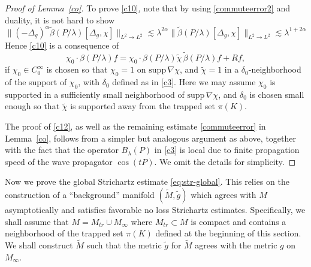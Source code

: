 \documentclass[10pt]{amsart}
\newcommand{\la}{\lambda}
\newcommand{\supp}{\mathrm{supp }}
\newcommand{\1}{{\bf 1}}
\begin{document}
\begin{proof}[Proof of Lemma~\ref{co}]
To prove \eqref{c10}, note that by using \eqref{commuteerror2} and duality, it is not hard to show 
$$\|(-\Delta_g)^\alpha\tilde\beta(P/\la)  [\Delta_g,\chi]\|_{L^2\to L^2}\lesssim \la^{2\alpha}\|\tilde\beta(P/\la)  [\Delta_g,\chi]\|_{L^2\to L^2} \lesssim \la^{1+2\alpha}$$
Hence \eqref{c10} is a consequence of 
\begin{equation}\label{c12}
\chi_0 \cdot \beta(P/\la)f
   =\chi_0 \cdot \beta(P/\la)\tilde\chi \,\tilde\beta(P/\la) f
+Rf,
\end{equation}
if $\chi_0\in C_0^\infty$ is chosen so that $\chi_0=1$ on $\supp\, \nabla\chi$, and $\tilde \chi=1$ in a $\delta_0$-neighborhood of the support of $\chi_0$, with $\delta_0$ defined as in \eqref{c3}. Here we may assume $\chi_0$ is supported in a sufficiently small neighborhood of $\supp\, \nabla\chi$, and 
 $\delta_0$ is chosen small enough so that $\tilde \chi$ is supported away from the trapped set $\pi(K)$.

The proof of \eqref{c12}, as well as the remaining estimate \eqref{commuteerror} in Lemma~\ref{co}, follows from a simpler but analogous argument as above, together with the fact that the operator $B_\la(P)$ in \eqref{c3} is local due to finite propagation speed of the wave propagator $\cos(tP)$. We omit the details for simplicity.
\end{proof}


\bigskip






Now we prove the global Strichartz estimate \eqref{eq:str-global}. This relies on the construction of a ``background'' manifold $(\tilde M, \tilde g)$ which agrees with $M$ asymptotically and satisfies favorable no loss Strichartz estimates. 
Specifically, we shall assume that
$M=M_{tr}\cup M_\infty$ where $M_{tr} \subset M$ is compact and contains a neighborhood of the trapped set $\pi(K)$ defined at the beginning of this section. We shall construct $\tilde M$ such that  
the metric $\tilde g$ for $\tilde M$ agrees with the metric $g$ on $M_\infty$.
\end{document}
